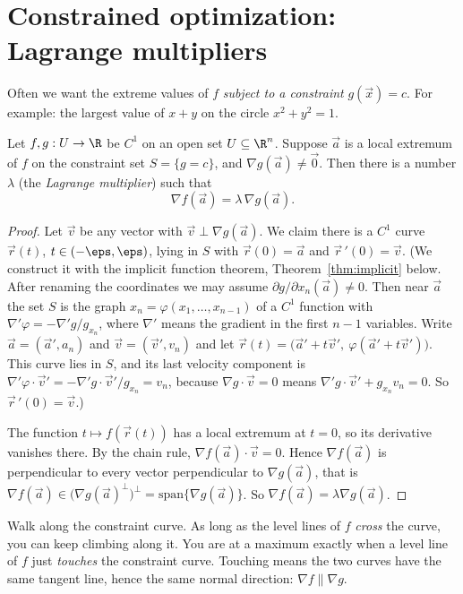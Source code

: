 \section{Constrained optimization: Lagrange multipliers}

Often we want the extreme values of $f$ \emph{subject to a constraint} $g(\vec x)=c$. For example: the largest value of $x+y$ on the circle $x^2+y^2=1$.

\begin{theorem}\label{thm:lagrange}
Let $f,g:U\to\R$ be $C^1$ on an open set $U\subseteq\R^n$. Suppose $\vec a$ is a local extremum of $f$ on the constraint set $S=\{g=c\}$, and $\nabla g(\vec a)\neq\vec 0$. Then there is a number $\lambda$ (the \emph{Lagrange multiplier}) such that
\[
\nabla f(\vec a)=\lambda\,\nabla g(\vec a).
\]
\end{theorem}

\begin{proof}
Let $\vec v$ be any vector with $\vec v\perp\nabla g(\vec a)$. We claim there is a $C^1$ curve $\vec r(t)$, $t\in(-\eps,\eps)$, lying in $S$ with $\vec r(0)=\vec a$ and $\vec r\,'(0)=\vec v$. (We construct it with the implicit function theorem, Theorem~\ref{thm:implicit} below. After renaming the coordinates we may assume $\partial g/\partial x_n(\vec a)\ne0$. Then near $\vec a$ the set $S$ is the graph $x_n=\varphi(x_1,\dots,x_{n-1})$ of a $C^1$ function with $\nabla'\varphi=-\nabla'g/g_{x_n}$, where $\nabla'$ means the gradient in the first $n-1$ variables. Write $\vec a=(\vec a',a_n)$ and $\vec v=(\vec v',v_n)$ and let $\vec r(t)=\bigl(\vec a'+t\vec v',\ \varphi(\vec a'+t\vec v')\bigr)$. This curve lies in $S$, and its last velocity component is $\nabla'\varphi\cdot\vec v'=-\nabla'g\cdot\vec v'/g_{x_n}=v_n$, because $\nabla g\cdot\vec v=0$ means $\nabla'g\cdot\vec v'+g_{x_n}v_n=0$. So $\vec r\,'(0)=\vec v$.)

The function $t\mapsto f(\vec r(t))$ has a local extremum at $t=0$, so its derivative vanishes there. By the chain rule, $\nabla f(\vec a)\cdot\vec v=0$. Hence $\nabla f(\vec a)$ is perpendicular to every vector perpendicular to $\nabla g(\vec a)$, that is $\nabla f(\vec a)\in\bigl(\nabla g(\vec a)^\perp\bigr)^\perp=\mathrm{span}\{\nabla g(\vec a)\}$. So $\nabla f(\vec a)=\lambda\nabla g(\vec a)$.
\end{proof}

\begin{intuition}
Walk along the constraint curve. As long as the level lines of $f$ \emph{cross} the curve, you can keep climbing along it. You are at a maximum exactly when a level line of $f$ just \emph{touches} the constraint curve. Touching means the two curves have the same tangent line, hence the same normal direction: $\nabla f\parallel\nabla g$.
\end{intuition}

